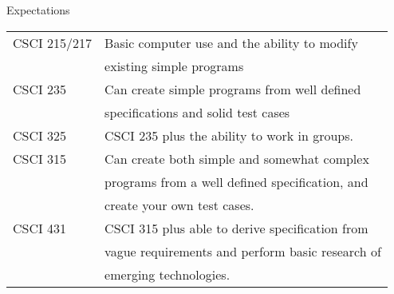 \documentclass{beamer}
\begin{document}
\begin{frame}{Expectations}
\begin{tabular}{l | l }
CSCI 215/217    & Basic computer use and the ability to modify \\ 
                & existing simple programs \\
CSCI 235        & Can create simple programs from well defined \\
                & specifications and solid test cases \\
CSCI 325        & CSCI 235 plus the ability to work in groups. \\
CSCI 315        & Can create both simple and somewhat complex  \\
                & programs from a well defined specification, and \\
                & create your own test cases. \\
CSCI 431        & CSCI 315 plus able to derive specification from \\
                & vague requirements and perform basic research of \\
                & emerging technologies. \\

\end{tabular}
\end{frame}

\end{document}
